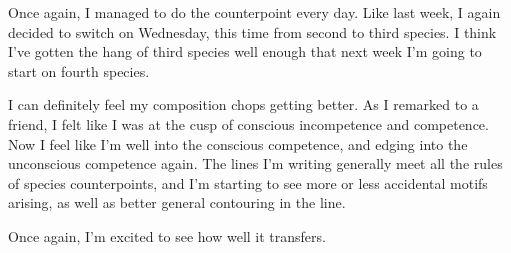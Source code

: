 \documentclass[12pt]{article}[titlepage]
\newcommand{\1}{\={a}}
\newcommand{\2}{\={e}}
\newcommand{\3}{\={\i}}
\newcommand{\4}{\=o}
\newcommand{\5}{\=u}
\newcommand{\6}{\={A}}
\renewcommand{\,}{\textsuperscript{,}}
\begin{document}
Once again, I managed to do the counterpoint every day.
Like last week, I again decided to switch on Wednesday, this time from second to third species.
I think I've gotten the hang of third species well enough that next week I'm going to start on fourth species.

I can definitely feel my composition chops getting better.
As I remarked to a friend, I felt like I was at the cusp of conscious incompetence and competence.
Now I feel like I'm well into the conscious competence, and edging into the unconscious competence again.
The lines I'm writing generally meet all the rules of species counterpoints, and I'm starting to see more or less accidental motifs arising, as well as better general contouring in the line.

Once again, I'm excited to see how well it transfers.
\end{document}
